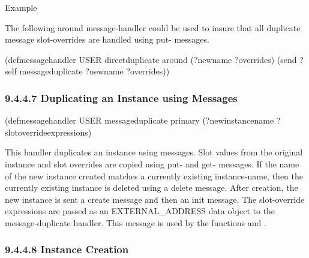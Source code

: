 \documentclass[letterpaper,10pt,english]{sphinxmanual}
\begin{document}
Example

The following around message-handler could be used to insure that all
duplicate message slot-overrides are handled using put- messages.

\begin{sphinxVerbatim}[commandchars=\\\{\}]
(defmessage\PYGZhy{}handler USER direct\PYGZhy{}duplicate around (?new\PYGZhy{}name ?overrides)
  (send ?self message\PYGZhy{}duplicate ?new\PYGZhy{}name ?overrides))
\end{sphinxVerbatim}


\subsubsection{9.4.4.7 Duplicating an Instance using Messages}
\label{\detokenize{cool:duplicating-an-instance-using-messages}}

\begin{sphinxVerbatim}[commandchars=\\\{\}]
(defmessage\PYGZhy{}handler USER message\PYGZhy{}duplicate primary
  (?new\PYGZhy{}instance\PYGZhy{}name ?slot\PYGZhy{}override\PYGZhy{}expressions)
\end{sphinxVerbatim}

This handler duplicates an instance using messages. Slot values from the
original instance and slot overrides are copied using put- and get-
messages. If the name of the new instance created matches a currently
existing instance-name, then the currently existing instance is deleted
using a delete message. After creation, the new instance is sent a
create message and then an init message. The slot-override expressions
are passed as an EXTERNAL\_ADDRESS data object to the message-duplicate
handler. This message is used by the functions
 and
.


\subsubsection{9.4.4.8 Instance Creation}
\label{\detokenize{cool:instance-creation}}

\begin{sphinxVerbatim}[commandchars=\\\{\}]
    
\end{sphinxVerbatim}
\end{document}
